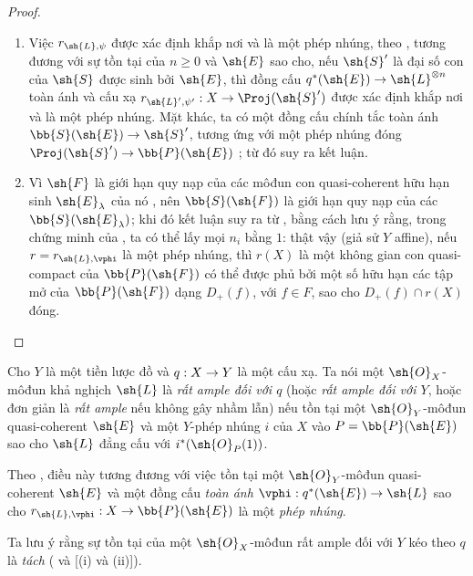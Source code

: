 \documentclass[oneside,10pt]{amsart}
\makeatletter
\renewcommand{\geq}{\geqslant}
\newcommand{\ega@arrow}[2]{\mathchoice{#1}{#2}{#2}{#2}}
\renewcommand{\to}{\ega@arrow{\longrightarrow}{\rightarrow}}
\let\EGAOriginalLabel\label
\renewcommand{\label}[1]{\phantomsection\EGAOriginalLabel{#1}}
\makeatother
\begin{document}
\begin{proof}
\medskip\noindent
\begin{enumerate}
  \item[\rm{(i)}] Việc $r_{\sh{L},\psi}$ được xác định khắp nơi và là một phép nhúng, theo , tương đương với sự tồn tại của $n\geq0$ và $\sh{E}$ sao cho, nếu $\sh{S}'$ là đại số con của $\sh{S}$ được sinh bởi $\sh{E}$, thì đồng cấu $q^*(\sh{E})\to\sh{L}^{\otimes n}$ toàn ánh và cấu xạ $r_{\sh{L}',\psi'}:X\to\Proj(\sh{S}')$ được xác định khắp nơi và là một phép nhúng.
    Mặt khác, ta có một đồng cấu chính tắc toàn ánh $\bb{S}(\sh{E})\to\sh{S}'$, tương ứng với một phép nhúng đóng $\Proj(\sh{S}')\to\bb{P}(\sh{E})$ ;
    từ đó suy ra kết luận.
  \item[\rm{(ii)}] Vì $\sh{F}$ là giới hạn quy nạp của các môđun con quasi-coherent hữu hạn sinh $\sh{E}_\lambda$ của nó , nên $\bb{S}(\sh{F})$ là giới hạn quy nạp của các $\bb{S}(\sh{E}_\lambda)$;
    khi đó kết luận suy ra từ , bằng cách lưu ý rằng, trong chứng minh của , ta có thể lấy mọi $n_i$ bằng $1$:
    thật vậy (giả sử $Y$ affine), nếu $r=r_{\sh{L},\vphi}$ là một phép nhúng, thì $r(X)$ là một không gian con quasi-compact của $\bb{P}(\sh{F})$ có thể được phủ bởi một số hữu hạn các tập mở của $\bb{P}(\sh{F})$ dạng $D_+(f)$, với $f\in F$, sao cho $D_+(f)\cap r(X)$ đóng.
\end{enumerate}
\end{proof}

\begin{definition}[4.4.2]
\label{II.4.4.2}
Cho $Y$ là một tiền lược đồ và $q:X\to Y$ là một cấu xạ.
Ta nói một $\sh{O}_X$-môđun khả nghịch $\sh{L}$ là \emph{rất ample đối với $q$} (hoặc \emph{rất ample đối với $Y$}, hoặc đơn giản là \emph{rất ample} nếu không gây nhầm lẫn) nếu tồn tại một $\sh{O}_Y$-môđun quasi-coherent $\sh{E}$ và một $Y$-phép nhúng $i$ của $X$ vào $P=\bb{P}(\sh{E})$ sao cho $\sh{L}$ đẳng cấu với $i^*(\sh{O}_P(1))$.
\end{definition}

Theo , điều này tương đương với việc tồn tại một $\sh{O}_Y$-môđun quasi-coherent $\sh{E}$ và một đồng cấu \emph{toàn ánh} $\vphi:q^*(\sh{E})\to\sh{L}$ sao cho $r_{\sh{L},\vphi}:X\to\bb{P}(\sh{E})$ là một \emph{phép nhúng}.

Ta lưu ý rằng sự tồn tại của một $\sh{O}_X$-môđun rất ample đối với $Y$ kéo theo $q$ là \emph{tách} ( và [(i) và (ii)]).
\end{document}
